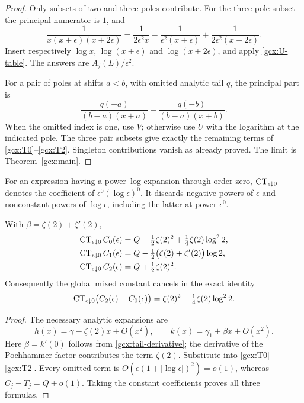 \begin{proof}
Only subsets of two and three poles contribute.  For the three-pole
subset the principal numerator is $1$, and
\[
 \frac1{x(x+\epsilon)(x+2\epsilon)}
 =\frac1{2\epsilon^2x}-\frac1{\epsilon^2(x+\epsilon)}
          +\frac1{2\epsilon^2(x+2\epsilon)}.
\]
Insert respectively $\log x$, $\log(x+\epsilon)$ and
$\log(x+2\epsilon)$, and apply \eqref{gcx:U-table}.  The answers are
$A_j(L)/\epsilon^2$.

For a pair of poles at shifts $a<b$, with omitted analytic tail $q$,
the principal part is
\[
 \frac{q(-a)}{(b-a)(x+a)}
    -\frac{q(-b)}{(b-a)(x+b)}.
\]
When the omitted index is one, use $V$; otherwise use $U$ with the
logarithm at the indicated pole.  The three pair subsets give exactly
the remaining terms of \eqref{gcx:T0}--\eqref{gcx:T2}.  Singleton
contributions vanish as already proved.  The limit is
Theorem~\ref{gcx:main}.
\end{proof}

For an expression having a power--log expansion through order zero,
$\operatorname{CT}_{\epsilon\downarrow0}$ denotes the coefficient of
$\epsilon^0(\log\epsilon)^0$.  It discards negative powers of $\epsilon$
and nonconstant powers of $\log\epsilon$, including the latter at power
$\epsilon^0$.

\begin{corollary}\label{gcx:CT-values}
With $\beta=\zeta(2)+\zeta'(2)$,
\begin{align}
 \operatorname{CT}_{\epsilon\downarrow0}C_0(\epsilon)
      &=Q-\tfrac12\zeta(2)^2+\tfrac14\zeta(2)\log^22,
 \label{gcx:CT0}\\
 \operatorname{CT}_{\epsilon\downarrow0}C_1(\epsilon)
      &=Q-\tfrac12\bigl(\zeta(2)+\zeta'(2)\bigr)\log2,
 \label{gcx:CT1}\\
 \operatorname{CT}_{\epsilon\downarrow0}C_2(\epsilon)
      &=Q+\tfrac12\zeta(2)^2.
 \label{gcx:CT2}
\end{align}
Consequently the global mixed constant cancels in the exact identity
\begin{equation}\label{gcx:CT-difference}
 \operatorname{CT}_{\epsilon\downarrow0}\bigl(C_2(\epsilon)-C_0(\epsilon)\bigr)
       =\zeta(2)^2-\tfrac14\zeta(2)\log^22.
\end{equation}
\end{corollary}

\begin{proof}
The necessary analytic expansions are
\[
 h(x)=\gamma-\zeta(2)x+O(x^2),\qquad
 k(x)=\gamma_1+\beta x+O(x^2).
\]
Here $\beta=k'(0)$ follows from \eqref{gcx:tail-derivative}; the derivative
of the Pochhammer factor contributes the term $\zeta(2)$.
Substitute into \eqref{gcx:T0}--\eqref{gcx:T2}.  Every omitted term is
$O(\epsilon(1+|\log\epsilon|)^2)=o(1)$, whereas
$C_j-T_j=Q+o(1)$.  Taking the constant coefficients proves all three
formulas.
\end{proof}

